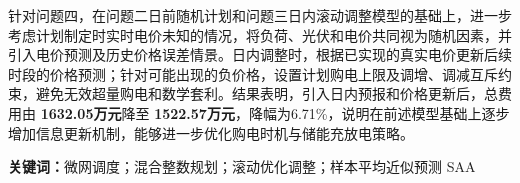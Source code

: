针对问题四，在问题二日前随机计划和问题三日内滚动调整模型的基础上，进一步考虑计划制定时实时电价未知的情况，将负荷、光伏和电价共同视为随机因素，并引入电价预测及历史价格误差情景。日内调整时，根据已实现的真实电价更新后续时段的价格预测；针对可能出现的负价格，设置计划购电上限及调增、调减互斥约束，避免无效超量购电和数学套利。结果表明，引入日内预报和价格更新后，总费用由 \textbf{1632.05万元}降至 \textbf{1522.57万元}，降幅为6.71\%，说明在前述模型基础上逐步增加信息更新机制，能够进一步优化购电时机与储能充放电策略。

\par\vspace{0.8\baselineskip}
\noindent\textbf{关键词：}微网调度；混合整数规划；滚动优化调整；样本平均近似预测 SAA
\endgroup

\newpage
